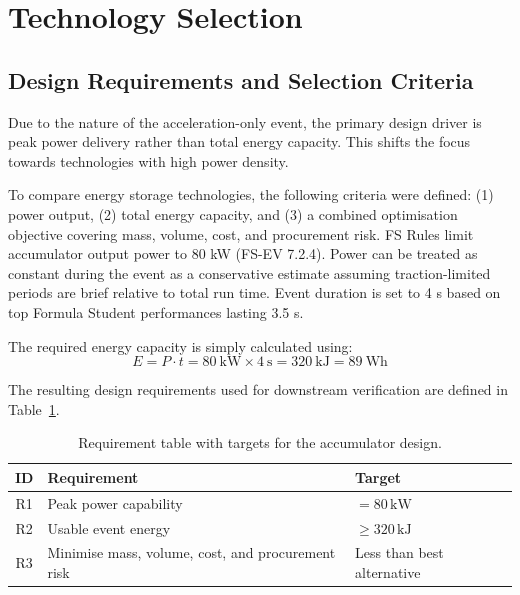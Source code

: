 \documentclass[11pt, a4paper]{report}
\numberwithin{equation}{section}
\begin{document}
\section{Technology Selection}

\subsection{Design Requirements and Selection Criteria}
Due to the nature of the acceleration-only event, the primary design driver is peak power delivery rather than total energy capacity. This shifts the focus towards technologies with high power density.

To compare energy storage technologies, the following criteria were defined: (1) power output, (2) total energy capacity, and (3) a combined optimisation objective covering mass, volume, cost, and procurement risk.
FS Rules limit accumulator output power to 80 kW (FS-EV 7.2.4). Power can be treated as constant during the event as a conservative estimate assuming traction-limited periods are brief relative to total run time. Event duration is set to 4 s based on top Formula Student performances lasting 3.5 s.

The required energy capacity is simply calculated using:
\begin{equation*}
E = P \cdot t = 80~\text{kW} \times 4~\text{s} = 320~\text{kJ} = 89~\text{Wh}
\end{equation*}

The resulting design requirements used for downstream verification are defined in Table~\ref{tab:design_requirement_ids}.

\begin{table}[htbp]
    \centering
    \caption{Requirement table with targets for the accumulator design.}
    \label{tab:design_requirement_ids}
    \footnotesize
    \begin{tabular}{|c|l|l|}
        \hline
        \textbf{ID} & \textbf{Requirement} & \textbf{Target} \\
        \hline
        R1 & Peak power capability & $= 80\,\text{kW}$ \\
        R2 & Usable event energy & $\geq 320\,\text{kJ}$\\
        R3 & Minimise mass, volume, cost, and procurement risk & Less than best alternative \\
        \hline
    \end{tabular}
\end{table}
\end{document}

